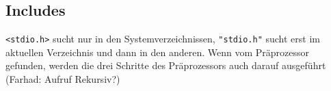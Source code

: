 \begin{multicols*}{4}
    \subsection{Includes}
    \texttt{<stdio.h>} sucht nur in den Systemverzeichnissen, \texttt{"stdio.h"} sucht erst im aktuellen Verzeichnis und dann in den anderen. Wenn vom Präprozessor gefunden, werden die drei Schritte des Präprozessors auch darauf ausgeführt (Farhad: Aufruf Rekursiv?)

\end{multicols*}

